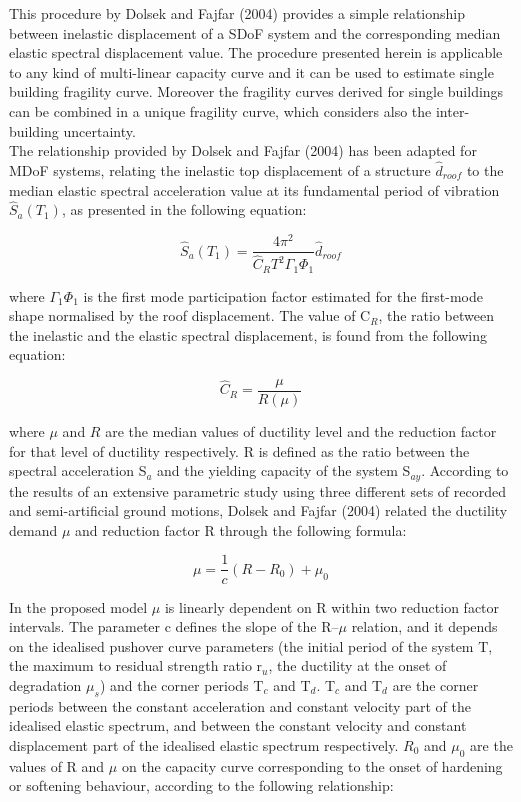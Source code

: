 This procedure by Dolsek and Fajfar (2004) provides a simple relationship between inelastic displacement of a SDoF system and the corresponding median elastic spectral displacement value. The procedure presented herein is applicable to any kind of multi-linear capacity curve and it can be used to estimate single building fragility curve. Moreover the fragility curves derived for single buildings can be combined in a unique fragility curve, which considers also the inter-building uncertainty.\\

The relationship provided by Dolsek and Fajfar (2004) has been adapted for MDoF systems, relating the inelastic top displacement of a structure $\hat{d}_{roof}$ to the median elastic spectral acceleration value at its fundamental period of vibration $\hat{S}_{a}(T_1)$, as presented in the following equation:
 
\begin{equation}
\hat{S}_a(T_1) = \frac{4 \pi^2}{\hat{C}_R T^2 \Gamma_1 \Phi_1} \hat{d}_{roof}
\label{eq:basic_DF}
\end{equation}

where $\Gamma_1 \Phi_1$ is the first mode participation factor estimated for the first-mode shape normalised by the roof displacement. The value of C$_R$, the ratio between the inelastic and the elastic spectral displacement, is found from the following equation:

\begin{equation}
\hat{C}_{R} = \frac{\mu}{R(\mu)}
\label{eq:Cr_DF}
\end{equation}

where $\mu$ and $R$ are the median values of ductility level and the reduction factor for that level of ductility respectively. R is defined as the ratio between the spectral acceleration S$_a$ and the yielding capacity of the system S$_{ay}$.  According to the results of an extensive parametric study using three different sets of recorded and semi-artificial ground motions, Dolsek and Fajfar (2004) related the ductility demand $\mu$ and reduction factor R through the following formula:

\begin{equation}
\label{eq:mu_DF}
\mu = \frac{1}{c} (R-R_{0})+\mu_{0}
\end{equation}

In the proposed model $\mu$ is linearly dependent on R within two reduction factor intervals. The parameter c defines the slope of the R–$\mu$ relation, and it depends on the idealised pushover curve parameters (the initial period of the system T, the maximum to residual strength ratio r$_{u}$, the ductility at the onset of degradation $\mu_s$) and the corner periods T$_{c}$ and T$_{d}$. T$_{c}$ and T$_{d}$ are the corner periods between the constant acceleration and constant velocity part of the idealised elastic spectrum, and between the constant velocity and constant displacement part of the idealised elastic spectrum respectively. $R_{0}$ and $\mu_{0}$ are the values of R and $\mu$ on the capacity curve corresponding to the onset of hardening or softening behaviour, according to the following relationship:

